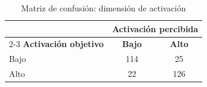 \begin{table}[htbp]
\centering
\caption{Matriz de confusión: dimensión de activación}
\label{tab:confusion_arousal}
\begin{tabular}{lcc}
\toprule
& \multicolumn{2}{c}{\textbf{Activación percibida}} \\
\cmidrule{2-3}
\textbf{Activación objetivo} & \textbf{Bajo} & \textbf{Alto} \\
\midrule
Bajo & 114 & 25 \\
Alto & 22 & 126 \\
\bottomrule
\end{tabular}
\end{table}

